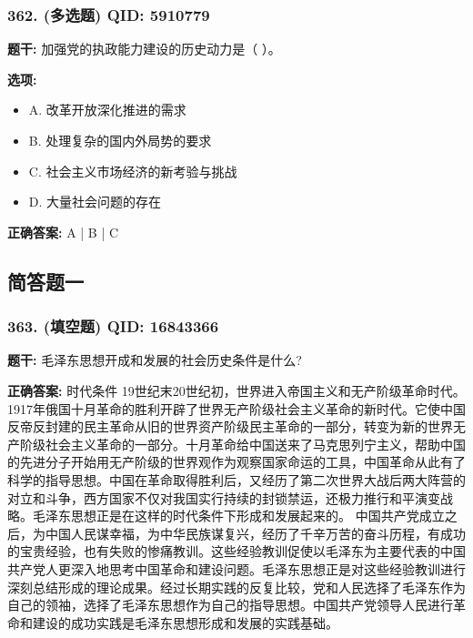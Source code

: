 \documentclass[12pt,UTF8]{ctexart}
\begin{document}
\subsubsection*{362. (多选题) \small QID: 5910779}

\textbf{题干:}
加强党的执政能力建设的历史动力是（ ）。

\textbf{选项:}
\begin{itemize}[leftmargin=*]

  \item A. 改革开放深化推进的需求

  \item B. 处理复杂的国内外局势的要求

  \item C. 社会主义市场经济的新考验与挑战

  \item D. 大量社会问题的存在

\end{itemize}

\textbf{正确答案:}
A | B | C

\vspace{0.3em}\hrulefill\vspace{0.7em}

\subsection*{简答题一}

\subsubsection*{363. (填空题) \small QID: 16843366}

\textbf{题干:}
毛泽东思想开成和发展的社会历史条件是什么?

\textbf{正确答案:}
时代条件
19世纪末20世纪初，世界进入帝国主义和无产阶级革命时代。1917年俄国十月革命的胜利开辟了世界无产阶级社会主义革命的新时代。它使中国反帝反封建的民主革命从旧的世界资产阶级民主革命的一部分，转变为新的世界无产阶级社会主义革命的一部分。十月革命给中国送来了马克思列宁主义，帮助中国的先进分子开始用无产阶级的世界观作为观察国家命运的工具，中国革命从此有了科学的指导思想。中国在革命取得胜利后，又经历了第二次世界大战后两大阵营的对立和斗争，西方国家不仅对我国实行持续的封锁禁运，还极力推行和平演变战略。毛泽东思想正是在这样的时代条件下形成和发展起来的。
中国共产党成立之后，为中国人民谋幸福，为中华民族谋复兴，经历了千辛万苦的奋斗历程，有成功的宝贵经验，也有失败的惨痛教训。这些经验教训促使以毛泽东为主要代表的中国共产党人更深入地思考中国革命和建设问题。毛泽东思想正是对这些经验教训进行深刻总结形成的理论成果。经过长期实践的反复比较，党和人民选择了毛泽东作为自己的领袖，选择了毛泽东思想作为自己的指导思想。中国共产党领导人民进行革命和建设的成功实践是毛泽东思想形成和发展的实践基础。
\end{document}
